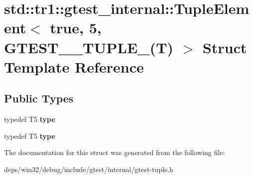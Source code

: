 \hypertarget{structstd_1_1tr1_1_1gtest__internal_1_1_tuple_element_3_01true_00_015_00_01_g_t_e_s_t__10___t_u_p_l_e___07_t_08_01_4}{}\section{std\+:\+:tr1\+:\+:gtest\+\_\+internal\+:\+:Tuple\+Element$<$ true, 5, G\+T\+E\+S\+T\+\_\+\_\+\+T\+U\+P\+L\+E\+\_\+(T) $>$ Struct Template Reference}
\label{structstd_1_1tr1_1_1gtest__internal_1_1_tuple_element_3_01true_00_015_00_01_g_t_e_s_t__10___t_u_p_l_e___07_t_08_01_4}
\subsection*{Public Types}
\begin{DoxyCompactItemize}
\item 
\hypertarget{structstd_1_1tr1_1_1gtest__internal_1_1_tuple_element_3_01true_00_015_00_01_g_t_e_s_t__10___t_u_p_l_e___07_t_08_01_4_a9f0364ab4515993fe6694026ff6ba13c}{}typedef T5 {\bfseries type}\label{structstd_1_1tr1_1_1gtest__internal_1_1_tuple_element_3_01true_00_015_00_01_g_t_e_s_t__10___t_u_p_l_e___07_t_08_01_4_a9f0364ab4515993fe6694026ff6ba13c}

\item 
\hypertarget{structstd_1_1tr1_1_1gtest__internal_1_1_tuple_element_3_01true_00_015_00_01_g_t_e_s_t__10___t_u_p_l_e___07_t_08_01_4_a9f0364ab4515993fe6694026ff6ba13c}{}typedef T5 {\bfseries type}\label{structstd_1_1tr1_1_1gtest__internal_1_1_tuple_element_3_01true_00_015_00_01_g_t_e_s_t__10___t_u_p_l_e___07_t_08_01_4_a9f0364ab4515993fe6694026ff6ba13c}

\end{DoxyCompactItemize}


The documentation for this struct was generated from the following file\+:\begin{DoxyCompactItemize}
\item 
deps/win32/debug/include/gtest/internal/gtest-\/tuple.\+h\end{DoxyCompactItemize}
